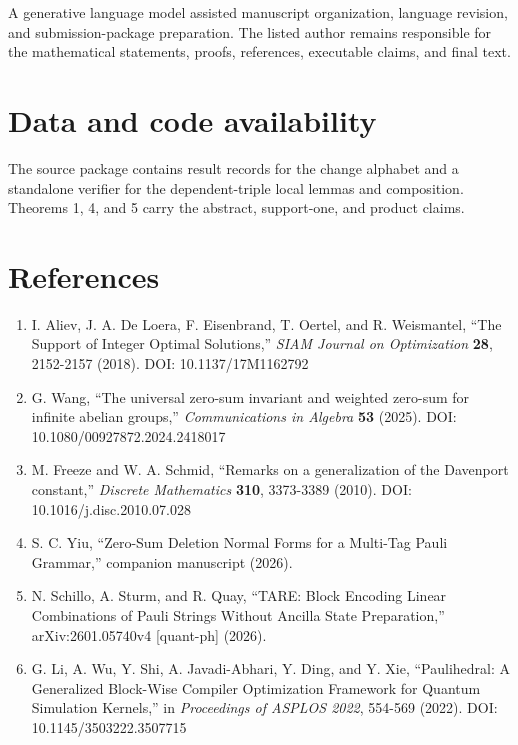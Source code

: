 \documentclass[
  11pt,
]{article}
\providecommand{\tightlist}{%
  \setlength{\itemsep}{0pt}\setlength{\parskip}{0pt}}
\begin{document}
A generative language model assisted manuscript organization, language
revision, and submission-package preparation. The listed author remains
responsible for the mathematical statements, proofs, references,
executable claims, and final text.

\hypertarget{data-and-code-availability}{%
\section{Data and code availability}\label{data-and-code-availability}}

The source package contains result records for the change alphabet and a
standalone verifier for the dependent-triple local lemmas and
composition. Theorems 1, 4, and 5 carry the abstract, support-one, and
product claims.

\hypertarget{references}{%
\section{References}\label{references}}

\begin{enumerate}
\def\labelenumi{\arabic{enumi}.}
\tightlist
\item
  I. Aliev, J. A. De Loera, F. Eisenbrand, T. Oertel, and R. Weismantel,
  ``The Support of Integer Optimal Solutions,'' \emph{SIAM Journal on
  Optimization} \textbf{28}, 2152-2157 (2018). DOI: 10.1137/17M1162792
\item
  G. Wang, ``The universal zero-sum invariant and weighted zero-sum for
  infinite abelian groups,'' \emph{Communications in Algebra}
  \textbf{53} (2025). DOI: 10.1080/00927872.2024.2418017
\item
  M. Freeze and W. A. Schmid, ``Remarks on a generalization of the
  Davenport constant,'' \emph{Discrete Mathematics} \textbf{310},
  3373-3389 (2010). DOI: 10.1016/j.disc.2010.07.028
\item
  S. C. Yiu, ``Zero-Sum Deletion Normal Forms for a Multi-Tag Pauli
  Grammar,'' companion manuscript (2026).
\item
  N. Schillo, A. Sturm, and R. Quay, ``TARE: Block Encoding Linear
  Combinations of Pauli Strings Without Ancilla State Preparation,''
  arXiv:2601.05740v4 {[}quant-ph{]} (2026).
\item
  G. Li, A. Wu, Y. Shi, A. Javadi-Abhari, Y. Ding, and Y. Xie,
  ``Paulihedral: A Generalized Block-Wise Compiler Optimization
  Framework for Quantum Simulation Kernels,'' in \emph{Proceedings of
  ASPLOS 2022}, 554-569 (2022). DOI: 10.1145/3503222.3507715
\end{enumerate}
\end{document}
